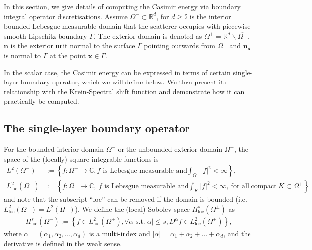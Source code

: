 
In this section, we give details of computing the Casimir energy via boundary integral operator discretisations. 
Assume 
$\Omega^{-}\subset \mathbb{R}^{d}$, for $d \geq 2$ is the interior bounded Lebesgue-measurable domain that the scatterer occupies with piecewise smooth Lipschitz boundary $\Gamma$. The exterior domain is denoted as 
$\Omega^{+} = \mathbb{R}^{d}\backslash\overline{\Omega^{-}}$. $\boldsymbol{n}$ is the exterior unit normal to the surface $\Gamma$ pointing outwards from $\Omega^{-}$ and 
$\boldsymbol{n}_{\boldsymbol{x}}$ is normal to $\Gamma$ at the point $\boldsymbol{x}\in\Gamma$.

In the scalar case, the Casimir energy can be expressed in terms of certain single-layer boundary operator, which we will define below. We then present its relationship with the Krein-Spectral shift function and demonstrate how it can practically be computed.

\subsection{The single-layer boundary operator}
For the bounded interior domain $\Omega^{-}$ or the unbounded exterior domain $\Omega^{+}$, the space of the (locally) square integrable functions is 
\begin{align*}
    L^{2}(\Omega^{-}) &:= \left\{f:\Omega^{-}\rightarrow\mathbb{C}, f \text{ is Lebesgue measurable and} \int_{\Omega^{-}}|f|^{2} < \infty \right\},\\
    L_{\text{loc}}^{2}(\Omega^{+}) &:= \left\{f:\Omega^{+}\rightarrow\mathbb{C},\ f \text{ is Lebesgue measurable and} \int_{K}|f|^{2} < \infty, \ \text{for all compact}\ K \subset \Omega^{+} \right\}
\end{align*}
and note that the subscript ``loc'' can be removed if the domain is bounded (i.e. $L_{\text{loc}}^{2}(\Omega^{-}) = L^{2}(\Omega^{-})$).
We define the (local) Sobolev space $H_{\text{loc}}^{s}(\Omega^{\pm})$ as 
\begin{align*}
    H_{\text{loc}}^{s}(\Omega^{\pm}):=\left\{f\in L_{\text{loc}}^{2}(\Omega^{\pm}), \forall\alpha \text{ s.t.} |\alpha|\leq s, D^{\alpha}f\in L_{\text{loc}}^{2}(\Omega^{\pm})\right\},
\end{align*}
where $\alpha = (\alpha_{1}, \alpha_{2}, \dots, \alpha_{d})$ is a multi-index and $|\alpha| = \alpha_{1} + \alpha_{2} + \dots + \alpha_{d}$, and 
the derivative is defined in the weak sense.

